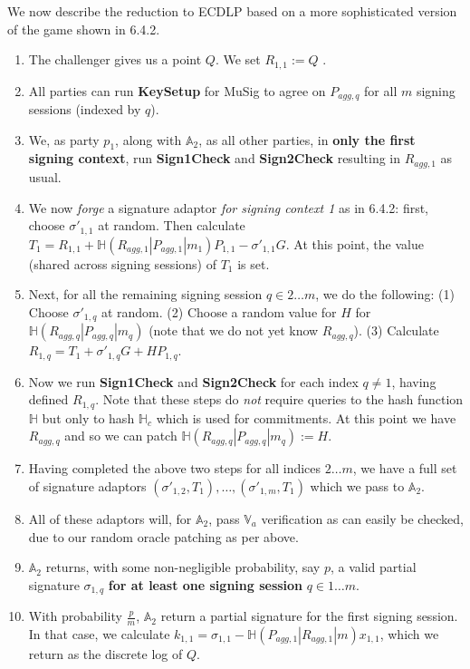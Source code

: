 \documentclass[10pt,a4paper]{article}
\begin{document}
We now describe the reduction to ECDLP based on a more sophisticated version of the game shown in 6.4.2.

\vspace{5 pt}

\begin{enumerate}
\item The challenger gives us a point $Q$. We set $R_{1,1} := Q$ .
\item All parties can run \textbf{KeySetup} for MuSig to agree on $P_{agg,q}$ for all $m$ signing sessions (indexed by $q$).
\item We, as party $p_1$, along with $\mathbb{A}_2$, as all other parties, in \textbf{only the first signing context}, run \textbf{Sign1Check} and \textbf{Sign2Check} resulting in  $R_{agg,1}$ as usual.
\item We now \emph{forge} a signature adaptor \emph{for signing context 1} as in 6.4.2: first, choose $\sigma'_{1,1}$ at random. Then calculate $T_1 = R_{1,1} + \mathbb{H}(R_{agg,1}|P_{agg,1}|m_1)P_{1,1} - \sigma'_{1,1} G$. At this point, the value (shared across signing sessions) of $T_1$ is set.
\item Next, for all the remaining signing session $q \in 2 \ldots m$, we do the following: (1) Choose $\sigma'_{1,q}$ at random. (2) Choose a random value for $H$ for $\mathbb{H}(R_{agg,q}|P_{agg,q}|m_q)$ (note that we do not yet know $R_{agg,q}$). (3) Calculate $R_{1,q} = T_1 + \sigma'_{1,q}G + HP_{1,q}$.
\item Now we run \textbf{Sign1Check} and \textbf{Sign2Check} for each index $q \ne 1$, having defined $R_{1, q}$. Note that these steps do \emph{not} require queries to the hash function $\mathbb{H}$ but only to hash $\mathbb{H}_c$ which is used for commitments. At this point we have $R_{agg,q}$ and so we can patch $\mathbb{H}(R_{agg,q}|P_{agg,q}|m_q) := H$.
\item Having completed the above two steps for all indices $2 \ldots m$, we have a full set of signature adaptors $(\sigma'_{1,2}, T_1), \ldots , (\sigma'_{1,m}, T_1)$ which we pass to $\mathbb{A}_2$.
\item All of these adaptors will, for $\mathbb{A}_2$, pass $\mathbb{V}_a$ verification as can easily be checked, due to our random oracle patching as per above.
\item $\mathbb{A}_2$ returns, with some non-negligible probability, say $p$, a valid partial signature $\sigma_{1, q}$ \textbf{for at least one signing session} $q \in 1 \ldots m$.
\item With probability $\frac{p}{m}$, $\mathbb{A}_2$ return a partial signature for the first signing session. In that case, we calculate $k_{1,1} = \sigma_{1,1} - \mathbb{H}(P_{agg,1}|R_{agg,1}|m)x_{1,1}$, which we return as the discrete log of $Q$.
\end{enumerate}
\end{document}
